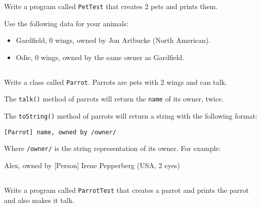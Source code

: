 \documentclass[a4paper, 11pt]{article}
\begin{document}
Write a program called \verb+PetTest+ that creates 2 pets and prints
them.

Use the following data for your animals:

\begin{itemize}

  \item Gardfield, 0 wings, owned by Jon Artbucke (North American).

  \item Odie, 0 wings, owned by the same owner as Gardfield.

\end{itemize}











\subsection{}

Write a class called \verb+Parrot+. Parrots are pets with 2 wings and can talk.

The \verb+talk()+ method of parrots will return the \verb+name+ of its owner,
twice.

The \verb+toString()+ method of parrots will return a string with the
following format:

\verb+[Parrot] name, owned by /owner/+

Where \verb+/owner/+ is the string representation of its owner. For example:

\begin{cmd}
[Parrot] Alex, owned by [Person] Irene Pepperberg (USA, 2 eyes)
\end{cmd}



\subsection{}

Write a program called \verb+ParrotTest+ that creates a parrot and prints
the parrot and also makes it talk.
\end{document}
